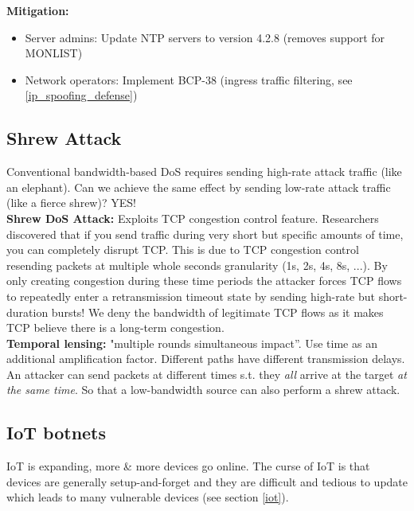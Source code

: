 \documentclass[11pt,oneside,a4paper]{article}
\begin{document}
\noindent \textbf{Mitigation:}

\vspace{-\topsep}
\begin{itemize}
	\setlength{\itemsep}{0pt}
	\setlength{\parskip}{0pt}
	\item Server admins: Update NTP servers to version 4.2.8 (removes support for MONLIST)
	\item Network operators: Implement BCP-38 (ingress traffic filtering, see \ref{ip_spoofing_defense})
\end{itemize}
\vspace{-\topsep}

\newpage

\subsection{Shrew Attack}

Conventional bandwidth-based DoS requires sending high-rate attack traffic (like an elephant). Can we achieve the same effect by sending low-rate attack traffic (like a fierce shrew)? YES!\\

\noindent \textbf{Shrew DoS Attack:} Exploits TCP congestion control feature. Researchers discovered that if you send traffic during very short but specific amounts of time, you can completely disrupt TCP. This is due to TCP congestion control resending packets at multiple whole seconds granularity (1s, 2s, 4s, 8s, ...). By only creating congestion during these time periods 
the attacker forces TCP flows to repeatedly enter a retransmission timeout state by sending high-rate but short-duration bursts! We deny the bandwidth of legitimate TCP flows as it makes TCP believe there is a long-term congestion.\\

\noindent \textbf{Temporal lensing:} "multiple rounds simultaneous impact”. Use time as an additional amplification factor. Different paths have different transmission delays. An attacker can send packets at different times s.t. they \textit{all} arrive at the target \textit{at the same time}. So that a low-bandwidth source can also perform a shrew attack.

\subsection{IoT botnets}

IoT is expanding, more \& more devices go online. The curse of IoT is that devices are generally setup-and-forget and they are difficult and tedious to update which leads to many vulnerable devices (see section \ref{iot}).\\
\end{document}
